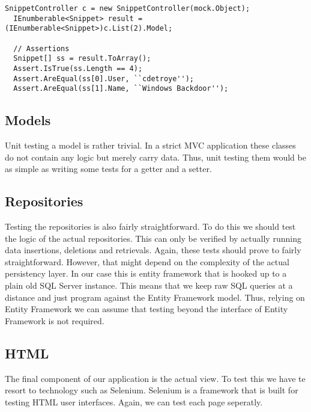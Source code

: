 \documentclass[10pt,a4paper,BCOR12mm, headexclude, footexclude,
  twoside, openright]{scrartcl}
\numberwithin{equation}{section} %
\numberwithin{figure}{section} %
\numberwithin{table}{section} %
\begin{document}
\begin{lstlisting}[caption={Testing the model of a controller using Moq and Ninject.}, label={lst:testcontroller}]
  SnippetController c = new SnippetController(mock.Object);
  IEnumberable<Snippet> result = (IEnumberable<Snippet>)c.List(2).Model;

  // Assertions
  Snippet[] ss = result.ToArray();
  Assert.IsTrue(ss.Length == 4);
  Assert.AreEqual(ss[0].User, ``cdetroye'');
  Assert.AreEqual(ss[1].Name, ``Windows Backdoor'');
\end{lstlisting}

\subsection{Models}
Unit testing a model is rather trivial. In a strict MVC application these
classes do not contain any logic but merely carry data. Thus, unit
testing them would be as simple as writing some tests for a getter and a setter.

\subsection{Repositories}
Testing the repositories is also fairly straightforward. To do this we should
test the logic of the actual repositories. This can only be verified by actually
running data insertions, deletions and retrievals. Again, these tests should
prove to fairly straightforward. However, that might depend on the complexity of
the actual persistency layer. In our case this is entity framework that is
hooked up to a plain old SQL Server instance. This means that we keep raw SQL
queries at a distance and just program against the Entity Framework model. Thus,
relying on Entity Framework we can assume that testing beyond the interface of
Entity Framework is not required.

\subsection{HTML}
The final component of our application is the actual view. To test this we have
te resort to technology such as Selenium. Selenium is a framework that is built
for testing HTML user interfaces. Again, we can test each page seperatly.
\end{document}
